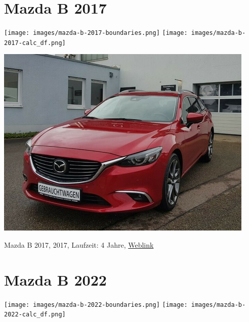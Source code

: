 \documentclass[landscape, DIV=99, 14pt]{scrartcl}
\begin{document}
\pagebreak


\twocolumn

\section*{Mazda B 2017}
\begin{center}
\texttt{[image: images/mazda-b-2017-boundaries.png]}
\null
\vspace{0.5cm}
\texttt{[image: images/mazda-b-2017-calc\_df.png]}
\end{center}

\pagebreak
\null
\vspace{2cm}
\begin{center}
\includegraphics[width=0.9\columnwidth]{cars/mazda-6-alt.png}

Mazda B 2017, 2017, Laufzeit: 4 Jahre, \href{https://suchen.mobile.de/fahrzeuge/details.html?action=parkItem&id=332186075}{Weblink}
\end{center}

\pagebreak


\twocolumn

\section*{Mazda B 2022}
\begin{center}
\texttt{[image: images/mazda-b-2022-boundaries.png]}
\null
\vspace{0.5cm}
\texttt{[image: images/mazda-b-2022-calc\_df.png]}
\end{center}
\end{document}

